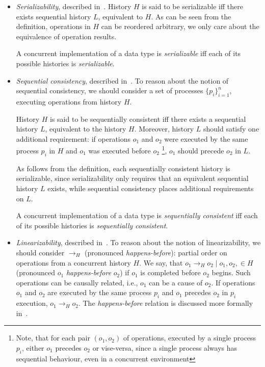 \documentclass[times, dvipsnames,%
               languages={russian,english} %
              ]{itmo-student-thesis}
\begin{document}
\begin{itemize}
    \item \emph{Serializability}, described in~\cite{papadimitriou1979serializability,spanner-serializability}. History $H$ is said to be serializable iff there exists sequential history $L$, equivalent to $H$. As can be seen from the definition, operations in $H$ can be reordered arbitrary, we only care about the equivalence of operation results.
    
    A concurrent implementation of a data type is \emph{serializable} iff each of its possible histories is \emph{serializable}.
    
    \item \emph{Sequential consistency}, described in~\cite{lamport1979make}. To reason about the notion of sequential consistency, we should consider a set of processes $\{p_i\}_{i = 1}^n$, executing operations from history $H$. 
    
    History $H$ is said to be sequentially consistent iff there exists a sequential history $L$, equivalent to the history $H$. Moreover, history $L$ should satisfy one additional requirement: if operations $o_1$ and $o_2$ were executed by the same process $p_i$ in $H$ and $o_1$ was executed before $o_2$ \footnote{Note, that for each pair $(o_1, o_2)$ of operations, executed by a single process $p_i$, either $o_1$ precedes $o_2$ or vise-versa, since a single process always has sequential behaviour, even in a concurrent environment}, $o_1$ should precede $o_2$ in $L$.
    
    As follows from the definition, each sequentially consistent history is serializable, since serializability only requires that an equivalent sequential history $L$ exists, while sequential consistency places additional requirements on $L$.
    
    A concurrent implementation of a data type is \emph{sequentially consistent} iff each of its possible histories is \emph{sequentially consistent}.
    
    \item \emph{Linearizability}, described in~\cite{herlihy1990linearizability}. To reason about the notion of linearizability, we should consider $\rightarrow_H$ (pronounced \emph{happens-before}): partial order on operations from a concurrent history $H$. We say, that $o_1 \rightarrow_H o_2 \mid o_1, o_2, \in H$ (pronounced $o_1$ \emph{happens-before} $o_2$) if $o_1$ is completed before $o_2$ begins. Such operations can be causally related, i.e., $o_1$ can be a cause of $o_2$. If operations $o_1$ and $o_2$ are executed by the same process $p_i$ and $o_1$ precedes $o_2$ in $p_i$ execution, $o_1 \rightarrow_H o_2$. The \emph{happens-before} relation is discussed more formally in~\cite{lamport2019time}.
    

\end{itemize}
\end{document}
